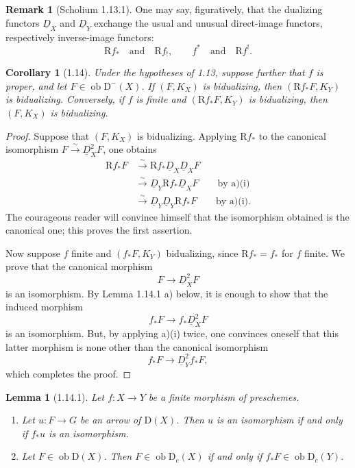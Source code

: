 \documentclass[11pt,a4paper]{article}
\newcommand{\D}{\mathrm{D}}
\newcommand{\ob}{\operatorname{ob}}
\newcommand{\Ddual}{\underline{D}}
\theoremstyle{plain}
\newtheorem*{lemmastar}{Lemma}
\newtheorem*{corollarystar}{Corollary}
\theoremstyle{definition}
\newtheorem*{remarkstar}{Remark}
\begin{document}
\begin{remarkstar}[Scholium 1.13.1]
One may say, figuratively, that the dualizing functors $\Ddual_X$ and $\Ddual_Y$ exchange the usual and unusual direct-image functors, respectively inverse-image functors:
\[
\mathrm Rf_*\quad\text{and}\quad \mathrm Rf_!,
\qquad
f^*\quad\text{and}\quad \mathrm Rf^!.
\]
\end{remarkstar}

\begin{corollarystar}[1.14]
Under the hypotheses of 1.13, suppose further that $f$ is proper, and let $F\in\ob\D^-(X)$. If $(F,K_X)$ is bidualizing, then $(\mathrm Rf_*F,K_Y)$ is bidualizing. Conversely, if $f$ is finite and $(\mathrm Rf_*F,K_Y)$ is bidualizing, then $(F,K_X)$ is bidualizing.
\end{corollarystar}

\begin{proof}
Suppose that $(F,K_X)$ is bidualizing. Applying $\mathrm Rf_*$ to the canonical isomorphism $F\xrightarrow{\sim}\Ddual_X^2F$, one obtains
\begin{align*}
\mathrm Rf_*F
&\xrightarrow{\sim}\mathrm Rf_*\Ddual_X\Ddual_XF\\
&\xrightarrow{\sim}\Ddual_Y\mathrm Rf_*\Ddual_XF \qquad\text{by a)(i)}\\
&\xrightarrow{\sim}\Ddual_Y\Ddual_Y\mathrm Rf_*F \qquad\text{by a)(i).}
\end{align*}
The courageous reader will convince himself that the isomorphism obtained is the canonical one; this proves the first assertion.

Now suppose $f$ finite and $(f_*F,K_Y)$ bidualizing, since $\mathrm Rf_*=f_*$ for $f$ finite. We prove that the canonical morphism
\[
F\longrightarrow \Ddual_X^2F
\]
is an isomorphism. By Lemma 1.14.1 a) below, it is enough to show that the induced morphism
\[
f_*F\longrightarrow f_*\Ddual_X^2F
\]
is an isomorphism. But, by applying a)(i) twice, one convinces oneself that this latter morphism is none other than the canonical isomorphism
\[
f_*F\longrightarrow \Ddual_Y^2f_*F,
\]
which completes the proof.
\end{proof}

\begin{lemmastar}[1.14.1]
Let $f:X\to Y$ be a finite morphism of preschemes.
\begin{enumerate}[label=\alph*)]
\item Let $u:F\to G$ be an arrow of $\D(X)$. Then $u$ is an isomorphism if and only if $f_*u$ is an isomorphism.
\item Let $F\in\ob\D(X)$. Then $F\in\ob\D_c(X)$ if and only if $f_*F\in\ob\D_c(Y)$.
\end{enumerate}
\end{lemmastar}
\end{document}
